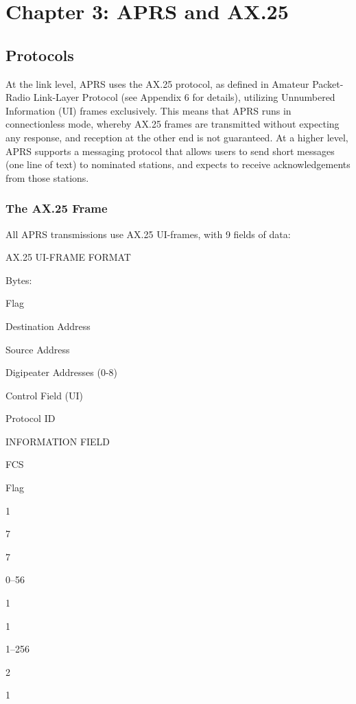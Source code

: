 \chapter{Chapter 3: APRS and AX.25}


\section{Protocols}

At the link level, APRS uses the AX.25 protocol, as defined in Amateur
Packet-Radio Link-Layer Protocol (see Appendix 6 for details), utilizing
Unnumbered Information (UI) frames exclusively. This means that APRS
runs in connectionless mode, whereby AX.25 frames are transmitted without
expecting any response, and reception at the other end is not guaranteed.
At a higher level, APRS supports a messaging protocol that allows users to
send short messages (one line of text) to nominated stations, and expects to
receive acknowledgements from those stations.

\subsection{The AX.25 Frame}

All APRS transmissions use AX.25 UI-frames, with 9 fields of data:







AX.25 UI-FRAME FORMAT

Bytes:

Flag

Destination
Address

Source
Address

Digipeater
Addresses
(0-8)

Control
Field
(UI)

Protocol
ID

INFORMATION FIELD

FCS

Flag

1

7

7

0–56

1

1

1–256

2

1




